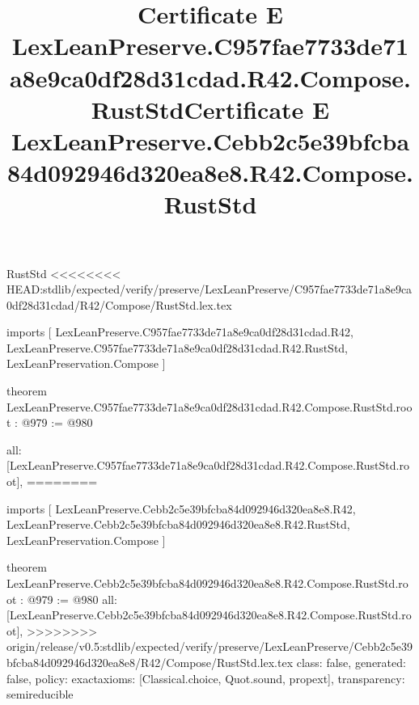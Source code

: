 \begin{lexlean}{RustStd}
<<<<<<<< HEAD:stdlib/expected/verify/preserve/LexLeanPreserve/C957fae7733de71a8e9ca0df28d31cdad/R42/Compose/RustStd.lex.tex
\title{Certificate E LexLeanPreserve.C957fae7733de71a8e9ca0df28d31cdad.R42.Compose.RustStd}
\begin{coremodule}
imports [
  LexLeanPreserve.C957fae7733de71a8e9ca0df28d31cdad.R42,
  LexLeanPreserve.C957fae7733de71a8e9ca0df28d31cdad.R42.RustStd,
  LexLeanPreservation.Compose
]

theorem LexLeanPreserve.C957fae7733de71a8e9ca0df28d31cdad.R42.Compose.RustStd.root : @979 := @980 {
  all: [LexLeanPreserve.C957fae7733de71a8e9ca0df28d31cdad.R42.Compose.RustStd.root],
========
\title{Certificate E LexLeanPreserve.Cebb2c5e39bfcba84d092946d320ea8e8.R42.Compose.RustStd}
\begin{coremodule}
imports [
  LexLeanPreserve.Cebb2c5e39bfcba84d092946d320ea8e8.R42,
  LexLeanPreserve.Cebb2c5e39bfcba84d092946d320ea8e8.R42.RustStd,
  LexLeanPreservation.Compose
]

theorem LexLeanPreserve.Cebb2c5e39bfcba84d092946d320ea8e8.R42.Compose.RustStd.root : @979 := @980 {
  all: [LexLeanPreserve.Cebb2c5e39bfcba84d092946d320ea8e8.R42.Compose.RustStd.root],
>>>>>>>> origin/release/v0.5:stdlib/expected/verify/preserve/LexLeanPreserve/Cebb2c5e39bfcba84d092946d320ea8e8/R42/Compose/RustStd.lex.tex
  class: false,
  generated: false,
  policy: exact{axioms: [Classical.choice, Quot.sound, propext]},
  transparency: semireducible
}


\end{coremodule}}
\end{coremodule}
\end{lexlean}
